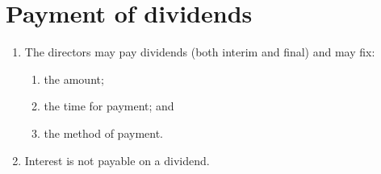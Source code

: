 \section{Payment of dividends}

\begin{enumerate}[label=(\alph*)]
    \item The directors may pay dividends (both interim and final) and may fix:
    \begin{enumerate}[label=(\roman*)]
        \item the amount;
        \item the time for payment; and
        \item the method of payment.
    \end{enumerate}
    
    \item Interest is not payable on a dividend.
\end{enumerate} 